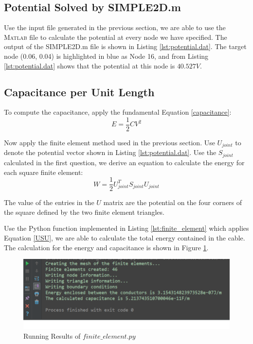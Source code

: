 \documentclass[a4paper,titlepage]{article}
\newcommand{\MATLAB}{\textsc{Matlab}\xspace}
\begin{document}
		\subsection{Potential Solved by SIMPLE2D.m}
			Use the input file generated in the previous section, we are able to use the \MATLAB file to calculate the potential at every node we have specified. The output of the SIMPLE2D.m file is shown in Listing \ref{lst:potential.dat}. The target node (0.06, 0.04) is highlighted in blue as Node 16, and from Listing \ref{lst:potential.dat} shows that the potential at this node is $40.527V$.
			
		\subsection{Capacitance per Unit Length}
			To compute the capacitance, apply the fundamental Equation \ref{capacitance}: 
			\begin{equation}
				E = \frac{1}{2} CV^2
				\label{capacitance}
			\end{equation}
			
			Now apply the finite element method used in the previous section. Use $U_{joint}$ to denote the potential vector shown in Listing \ref{lst:potential.dat}. Use the $S_{joint}$ calculated in the first question, we derive an equation to calculate the energy for each square finite element:
			\begin{equation}
				W = \frac{1}{2}U^T_{joint}S_{joint}U_{joint}
				\label{USU}
			\end{equation}
			
			The value of the entries in the $U$ matrix are the potential on the four corners of the square defined by the two finite element triangles.
			
			Use the Python function implemented in Listing \ref{lst:finite_element} which applies Equation \ref{USU}, we are able to calculate the total energy contained in the cable. The calculation for the energy and capacitance is shown in Figure \ref{q2_run}.
			\begin{figure}[!h]
				\centering
				\includegraphics[width=0.7\linewidth]{q2_run}
				\caption{Running Results of $finite\_element.py$}
				\label{q2_run}
			\end{figure}
			
\end{document}

